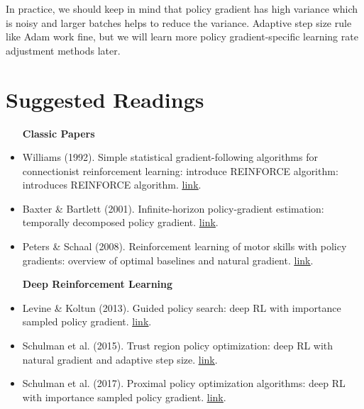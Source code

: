 \documentclass{tufte-handout}
\begin{document}
In practice, we should keep in mind that policy gradient has high variance which is noisy and larger batches helps to reduce the variance. Adaptive step size rule like Adam work fine, but we will learn more policy gradient-specific learning rate adjustment methods later.

\section{Suggested Readings}
\begin{itemize}
  \item [\textbf{Classic Papers}]
  \item Williams (1992). Simple statistical gradient-following algorithms for connectionist reinforcement learning: introduce REINFORCE algorithm:
  introduces REINFORCE algorithm. \href{http://www-anw.cs.umass.edu/~barto/courses/cs687/williams92simple.pdf}{\underline{link}}.
  \item Baxter \& Bartlett (2001). Infinite-horizon policy-gradient estimation: temporally decomposed policy gradient.
  \href{https://www.jair.org/media/806/live-806-1942-jair.pdf}{\underline{link}}.
  \item Peters \& Schaal (2008). Reinforcement learning of motor skills with policy gradients: overview of optimal baselines and natural gradient.
  \href{http://www.kyb.mpg.de/fileadmin/user_upload/files/publications/attachments/Neural-Netw-2008-21-682_4867%5b0%5d.pdf}{\underline{link}}.
  \item [\textbf{Deep Reinforcement Learning}]
  \item Levine \& Koltun (2013). Guided policy search: deep RL with importance sampled policy gradient.
  \href{https://graphics.stanford.edu/projects/gpspaper/gps_full.pdf}{\underline{link}}.
  \item Schulman et al. (2015). Trust region policy optimization: deep RL with natural gradient and adaptive step size.
  \href{https://arxiv.org/abs/1502.05477}{\underline{link}}.
  \item Schulman et al. (2017).  Proximal policy optimization algorithms: deep RL with importance sampled policy gradient.
  \href{https://arxiv.org/abs/1707.06347}{\underline{link}}.

\end{itemize}




\end{document}

